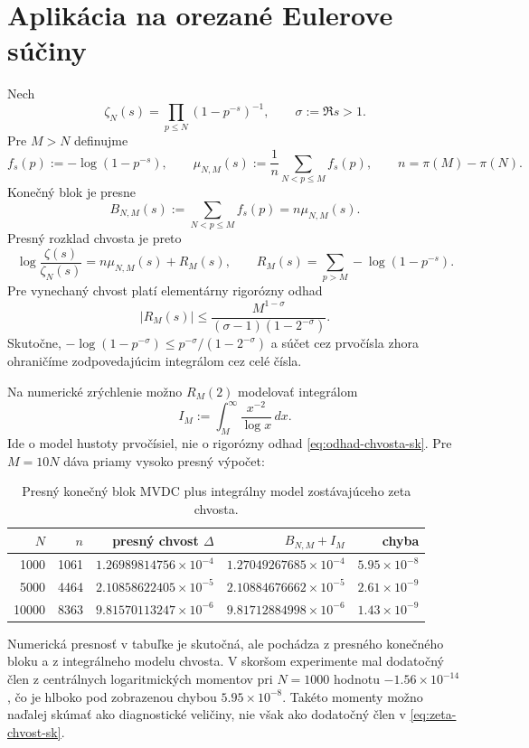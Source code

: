 \documentclass[11pt,a4paper]{article}
\begin{document}
\section{Aplikácia na orezané Eulerove súčiny}

Nech
\[
  \zeta_N(s)=\prod_{p\le N}(1-p^{-s})^{-1},
  \qquad \sigma:=\Re s>1.
\]
Pre \(M>N\) definujme
\[
  f_s(p):=-\log(1-p^{-s}),\qquad
  \mu_{N,M}(s):=\frac1n\sum_{N<p\le M}f_s(p),
  \qquad n=\pi(M)-\pi(N).
\]
Konečný blok je presne
\[
  B_{N,M}(s):=\sum_{N<p\le M}f_s(p)=n\mu_{N,M}(s).
\]
Presný rozklad chvosta je preto
\begin{equation}\label{eq:zeta-chvost-sk}
  \log\frac{\zeta(s)}{\zeta_N(s)}
  =n\mu_{N,M}(s)+R_M(s),
  \qquad
  R_M(s)=\sum_{p>M}-\log(1-p^{-s}).
\end{equation}
Pre vynechaný chvost platí elementárny rigorózny odhad
\begin{equation}\label{eq:odhad-chvosta-sk}
  |R_M(s)|
  \le
  \frac{M^{1-\sigma}}
  {(\sigma-1)(1-2^{-\sigma})}.
\end{equation}
Skutočne,
\(-\log(1-p^{-\sigma})\le p^{-\sigma}/(1-2^{-\sigma})\)
a súčet cez prvočísla zhora ohraničíme zodpovedajúcim integrálom cez
celé čísla.

Na numerické zrýchlenie možno \(R_M(2)\) modelovať integrálom
\[
  I_M:=\int_M^\infty\frac{x^{-2}}{\log x}\,dx.
\]
Ide o model hustoty prvočísiel, nie o rigorózny odhad
\eqref{eq:odhad-chvosta-sk}. Pre \(M=10N\) dáva priamy vysoko presný
výpočet:

\begin{table}[ht]
\centering
\begin{tabular}{rrrrr}
\toprule
\(N\) & \(n\) & presný chvost \(\Delta\) & \(B_{N,M}+I_M\) & chyba \\
\midrule
1000  & 1061 & \(1.26989814756\times10^{-4}\)
              & \(1.27049267685\times10^{-4}\) & \(5.95\times10^{-8}\) \\
5000  & 4464 & \(2.10858622405\times10^{-5}\)
              & \(2.10884676662\times10^{-5}\) & \(2.61\times10^{-9}\) \\
10000 & 8363 & \(9.81570113247\times10^{-6}\)
              & \(9.81712884998\times10^{-6}\) & \(1.43\times10^{-9}\) \\
\bottomrule
\end{tabular}
\caption{Presný konečný blok MVDC plus integrálny model zostávajúceho zeta chvosta.}
\end{table}

Numerická presnosť v tabuľke je skutočná, ale pochádza z presného
konečného bloku a z integrálneho modelu chvosta. V skoršom experimente
mal dodatočný člen z centrálnych logaritmických momentov pri \(N=1000\)
hodnotu \(-1.56\times10^{-14}\), čo je hlboko pod zobrazenou chybou
\(5.95\times10^{-8}\). Takéto momenty možno naďalej skúmať ako
diagnostické veličiny, nie však ako dodatočný člen v
\eqref{eq:zeta-chvost-sk}.
\end{document}
